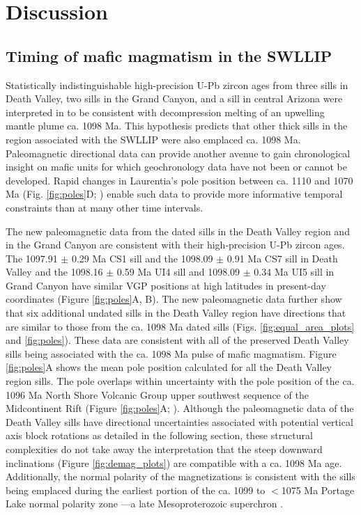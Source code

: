 \documentclass[draft]{agujournal2019}
\begin{document}
\section*{Discussion}

\subsection*{Timing of mafic magmatism in the SWLLIP}

Statistically indistinguishable high-precision U-Pb zircon ages from three sills in Death Valley, two sills in the Grand Canyon, and a sill in central Arizona were interpreted in  to be consistent with decompression melting of an upwelling mantle plume ca. 1098 Ma. This hypothesis predicts that other thick sills in the region associated with the SWLLIP were also emplaced ca. 1098 Ma. Paleomagnetic directional data can provide another avenue to gain chronological insight on mafic units for which geochronology data have not been or cannot be developed. Rapid changes in Laurentia's pole position between ca. 1110 and 1070 Ma (Fig. \ref{fig:poles}D; \cite{Swanson-Hysell2019a}) enable such data to provide more informative temporal constraints than at many other time intervals.

The new paleomagnetic data from the dated sills in the Death Valley region and in the Grand Canyon are consistent with their high-precision U-Pb zircon ages. The 1097.91 $\pm$ 0.29 Ma CS1 sill  and the 1098.09 $\pm$ 0.91 Ma CS7 sill in Death Valley and the 1098.16 $\pm$ 0.59 Ma UI4 sill and 1098.09 $\pm$ 0.34 Ma UI5 sill in Grand Canyon have similar VGP positions at high latitudes in present-day coordinates (Figure \ref{fig:poles}A, B). The new paleomagnetic data further show that six additional undated sills in the Death Valley region have directions that are similar to those from the ca. 1098 Ma dated sills (Figs. \ref{fig:equal_area_plots} and \ref{fig:poles}). These data are consistent with all of the preserved Death Valley sills being associated with the ca. 1098 Ma pulse of mafic magmatism. Figure \ref{fig:poles}A shows the mean pole position calculated for all the Death Valley region sills. The pole overlaps within uncertainty with the pole position of the ca. 1096 Ma North Shore Volcanic Group upper southwest sequence of the Midcontinent Rift (Figure \ref{fig:poles}A; ). Although the paleomagnetic data of the Death Valley sills have directional uncertainties associated with potential vertical axis block rotations as detailed in the following section, these structural complexities do not take away the interpretation that the steep downward inclinations (Figure \ref{fig:demag_plots}) are compatible with a ca. 1098 Ma age. Additionally, the normal polarity of the magnetizations is consistent with the sills being emplaced during the earliest portion of the ca. 1099 to $<$1075 Ma Portage Lake normal polarity zone \cite{Swanson-Hysell2019a}---a late Mesoproterozoic superchron \cite{Driscoll2016b}. 
\end{document}
